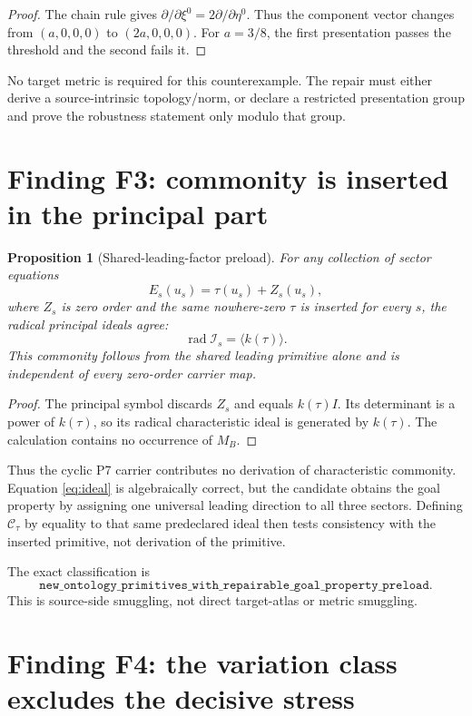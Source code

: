 \documentclass[11pt]{article}
\newtheorem{proposition}{Proposition}
\newcommand{\cI}{\mathcal{I}}
\newcommand{\cC}{\mathcal{C}}
\newcommand{\rad}{\operatorname{rad}}
\begin{document}
\begin{proof}
The chain rule gives
\(\partial/\partial\xi^0=2\partial/\partial\eta^0\).
Thus the component vector changes from \((a,0,0,0)\) to \((2a,0,0,0)\).
For \(a=3/8\), the first presentation passes the threshold and the second
fails it.
\end{proof}

No target metric is required for this counterexample.  The repair must either
derive a source-intrinsic topology/norm, or declare a restricted presentation
group and prove the robustness statement only modulo that group.

\section{Finding F3: commonity is inserted in the principal part}

\begin{proposition}[Shared-leading-factor preload]
For any collection of sector equations
\[
 E_s(u_s)=\tau(u_s)+Z_s(u_s),
\]
where \(Z_s\) is zero order and the same nowhere-zero \(\tau\) is inserted
for every \(s\), the radical principal ideals agree:
\[
 \rad\cI_s=\langle k(\tau)\rangle.
\]
This commonity follows from the shared leading primitive alone and is
independent of every zero-order carrier map.
\end{proposition}

\begin{proof}
The principal symbol discards \(Z_s\) and equals
\(k(\tau)I\).  Its determinant is a power of \(k(\tau)\), so its radical
characteristic ideal is generated by \(k(\tau)\).  The calculation contains
no occurrence of \(M_B\).
\end{proof}

Thus the cyclic P7 carrier contributes no derivation of characteristic
commonity.  Equation \eqref{eq:ideal} is algebraically correct, but the candidate obtains
the goal property by assigning one universal leading direction to all three
sectors.  Defining \(\cC_\tau\) by equality to that same predeclared ideal
then tests consistency with the inserted primitive, not derivation of the
primitive.

The exact classification is
\[
 \texttt{new\_ontology\_primitives\_with\_repairable\_goal\_property\_preload}.
\]
This is source-side smuggling, not direct target-atlas or metric smuggling.

\section{Finding F4: the variation class excludes the decisive stress}
\end{document}

